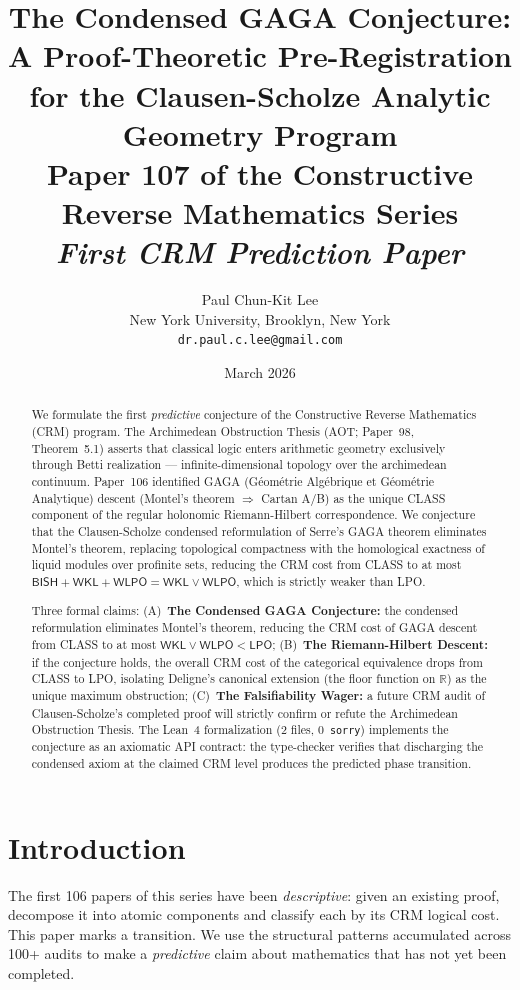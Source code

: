 \documentclass[11pt,a4paper]{article}
\title{\textbf{The Condensed GAGA Conjecture:\\
A Proof-Theoretic Pre-Registration\\
for the Clausen-Scholze Analytic Geometry Program}\\[6pt]
\large Paper 107 of the Constructive Reverse Mathematics Series\\[6pt]
\normalsize\textit{First CRM Prediction Paper}}
\author{Paul Chun-Kit Lee\\
\small New York University, Brooklyn, New York\\
\small\texttt{dr.paul.c.lee@gmail.com}}
\date{March 2026}
\theoremstyle{plain}
\theoremstyle{definition}
\newcommand{\BISH}{\textsf{BISH}}
\newcommand{\WKL}{\textsf{WKL}}
\newcommand{\WLPO}{\textsf{WLPO}}
\newcommand{\LPO}{\textsf{LPO}}
\newcommand{\CLASS}{\textsf{CLASS}}
\newcommand{\CRM}{\textsf{CRM}}
\newcommand{\R}{\mathbb{R}}
\begin{document}
\maketitle

\begin{abstract}
We formulate the first \emph{predictive} conjecture of the Constructive Reverse Mathematics (\CRM) program.
The Archimedean Obstruction Thesis (AOT; Paper~98, Theorem~5.1) asserts that classical logic enters arithmetic geometry exclusively through Betti realization --- infinite-dimensional topology over the archimedean continuum.
Paper~106 identified GAGA (G\'eom\'etrie Alg\'ebrique et G\'eom\'etrie Analytique) descent (Montel's theorem $\Rightarrow$ Cartan A/B) as the unique \CLASS{} component of the regular holonomic Riemann-Hilbert correspondence.
We conjecture that the Clausen-Scholze condensed reformulation of Serre's GAGA theorem eliminates Montel's theorem, replacing topological compactness with the homological exactness of liquid modules over profinite sets, reducing the CRM cost from \CLASS{} to at most $\BISH + \WKL + \WLPO = \WKL \vee \WLPO$, which is strictly weaker than \LPO.

Three formal claims:
(A)~\textbf{The Condensed GAGA Conjecture:} the condensed reformulation eliminates Montel's theorem, reducing the CRM cost of GAGA descent from \CLASS{} to at most $\WKL \vee \WLPO < \LPO$;
(B)~\textbf{The Riemann-Hilbert Descent:} if the conjecture holds, the overall CRM cost of the categorical equivalence drops from \CLASS{} to \LPO, isolating Deligne's canonical extension (the floor function on $\R$) as the unique maximum obstruction;
(C)~\textbf{The Falsifiability Wager:} a future CRM audit of Clausen-Scholze's completed proof will strictly confirm or refute the Archimedean Obstruction Thesis.
The Lean~4 formalization (2 files, 0~\texttt{sorry}) implements the conjecture as an axiomatic API contract: the type-checker verifies that discharging the condensed axiom at the claimed CRM level produces the predicted phase transition.
\end{abstract}

\section{Introduction}

The first 106 papers of this series have been \emph{descriptive}: given an existing proof, decompose it into atomic components and classify each by its CRM logical cost.
This paper marks a transition.
We use the structural patterns accumulated across 100+ audits to make a \emph{predictive} claim about mathematics that has not yet been completed.
\end{document}
